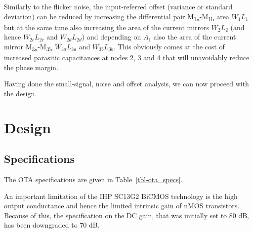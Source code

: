 \documentclass[
  a4paper,
  DIV=11,
  numbers=noendperiod]{scrreprt}
\begin{document}
Similarly to the flicker noise, the input-referred offset (variance or
standard deviation) can be reduced by increasing the differential pair
M\textsubscript{1a}-M\textsubscript{1b} area \(W_1 L_1\) but at the same
time also increasing the area of the current mirrors \(W_2 L_2\) (and
hence \(W_{2c} L_{2c}\) and \(W_{2d} L_{2d}\)) and depending on \(A_1\)
also the area of the current mirror
M\textsubscript{3a}-M\textsubscript{3b} \(W_{3a} L_{3a}\) and
\(W_{3b} L_{3b}\). This obviously comes at the cost of increased
parasitic capacitances at nodes 2, 3 and 4 that will unavoidably reduce
the phase margin.

Having done the small-signal, noise and offset analysis, we can now
proceed with the design.

\chapter{Design}\label{design}

\section{Specifications}\label{specifications}

The OTA specifications are given in Table~\ref{tbl-ota_specs}.

\begin{tcolorbox}[enhanced jigsaw, bottomrule=.15mm, colback=white, leftrule=.75mm, toprule=.15mm, opacitybacktitle=0.6, colbacktitle=quarto-callout-warning-color!10!white, left=2mm, colframe=quarto-callout-warning-color-frame, coltitle=black, bottomtitle=1mm, arc=.35mm, toptitle=1mm, titlerule=0mm, title=\textcolor{quarto-callout-warning-color}{\faExclamationTriangle}\hspace{0.5em}{Warning}, breakable, opacityback=0, rightrule=.15mm]

An important limitation of the IHP SC13G2 BiCMOS technology
 is the high output conductance and
hence the limited intrinsic gain of nMOS transistors. Because of this,
the specification on the DC gain, that was initially set to 80 dB, has
been downgraded to 70 dB.

\end{tcolorbox}
\end{document}
